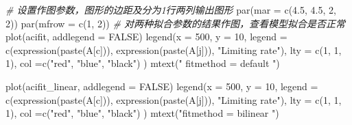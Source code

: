 \documentclass[
]{krantz}
\makeatletter
\newenvironment{Shaded}{\begin{snugshade}}{\end{snugshade}}
\newcommand{\AttributeTok}[1]{\textcolor[rgb]{0.77,0.63,0.00}{#1}}
\newcommand{\CommentTok}[1]{\textcolor[rgb]{0.56,0.35,0.01}{\textit{#1}}}
\newcommand{\ConstantTok}[1]{\textcolor[rgb]{0.00,0.00,0.00}{#1}}
\newcommand{\DecValTok}[1]{\textcolor[rgb]{0.00,0.00,0.81}{#1}}
\newcommand{\FloatTok}[1]{\textcolor[rgb]{0.00,0.00,0.81}{#1}}
\newcommand{\FunctionTok}[1]{\textcolor[rgb]{0.00,0.00,0.00}{#1}}
\newcommand{\NormalTok}[1]{#1}
\newcommand{\StringTok}[1]{\textcolor[rgb]{0.31,0.60,0.02}{#1}}
\newenvironment{kframe}{%
\medskip{}
\setlength{\fboxsep}{.8em}
 \def\at@end@of@kframe{}%
 \ifinner\ifhmode%
  \def\at@end@of@kframe{\end{minipage}}%
  \begin{minipage}{\columnwidth}%
 \fi\fi%
 \def\FrameCommand##1{\hskip\@totalleftmargin \hskip-\fboxsep
 \colorbox{shadecolor}{##1}\hskip-\fboxsep
     \hskip-\linewidth \hskip-\@totalleftmargin \hskip\columnwidth}%
 \MakeFramed {\advance\hsize-\width
   \@totalleftmargin\z@ \linewidth\hsize
   \@setminipage}}%
 {\par\unskip\endMakeFramed%
 \at@end@of@kframe}
\renewenvironment{Shaded}{\begin{kframe}}{\end{kframe}}
\makeatother
\begin{document}
\begin{Shaded}
\begin{Highlighting}[]
\CommentTok{\# 设置作图参数，图形的边距及分为1行两列输出图形}
\FunctionTok{par}\NormalTok{(}\AttributeTok{mar =} \FunctionTok{c}\NormalTok{(}\FloatTok{4.5}\NormalTok{, }\FloatTok{4.5}\NormalTok{, }\DecValTok{2}\NormalTok{, }\DecValTok{2}\NormalTok{))}
\FunctionTok{par}\NormalTok{(}\AttributeTok{mfrow =} \FunctionTok{c}\NormalTok{(}\DecValTok{1}\NormalTok{, }\DecValTok{2}\NormalTok{))}
\CommentTok{\# 对两种拟合参数的结果作图，查看模型拟合是否正常}
\FunctionTok{plot}\NormalTok{(acifit, }\AttributeTok{addlegend =} \ConstantTok{FALSE}\NormalTok{)}
\FunctionTok{legend}\NormalTok{(}\AttributeTok{x =} \DecValTok{500}\NormalTok{, }\AttributeTok{y =} \DecValTok{10}\NormalTok{, }
       \AttributeTok{legend =} \FunctionTok{c}\NormalTok{(}\FunctionTok{expression}\NormalTok{(}\FunctionTok{paste}\NormalTok{(A[c])), }
                \FunctionTok{expression}\NormalTok{(}\FunctionTok{paste}\NormalTok{(A[j])),}
                \StringTok{"Limiting rate"}\NormalTok{),}
       \AttributeTok{lty =} \FunctionTok{c}\NormalTok{(}\DecValTok{1}\NormalTok{, }\DecValTok{1}\NormalTok{, }\DecValTok{1}\NormalTok{),}
       \AttributeTok{col =}\FunctionTok{c}\NormalTok{(}\StringTok{"red"}\NormalTok{, }\StringTok{"blue"}\NormalTok{, }\StringTok{"black"}\NormalTok{) }
\NormalTok{         )}
\FunctionTok{mtext}\NormalTok{(}\StringTok{" fitmethod = \textquotesingle{}default\textquotesingle{} "}\NormalTok{)}

\FunctionTok{plot}\NormalTok{(acifit\_linear, }\AttributeTok{addlegend =} \ConstantTok{FALSE}\NormalTok{)}
\FunctionTok{legend}\NormalTok{(}\AttributeTok{x =} \DecValTok{500}\NormalTok{, }\AttributeTok{y =} \DecValTok{10}\NormalTok{, }
       \AttributeTok{legend =} \FunctionTok{c}\NormalTok{(}\FunctionTok{expression}\NormalTok{(}\FunctionTok{paste}\NormalTok{(A[c])), }
                  \FunctionTok{expression}\NormalTok{(}\FunctionTok{paste}\NormalTok{(A[j])),}
                  \StringTok{"Limiting rate"}\NormalTok{),}
       \AttributeTok{lty =} \FunctionTok{c}\NormalTok{(}\DecValTok{1}\NormalTok{, }\DecValTok{1}\NormalTok{, }\DecValTok{1}\NormalTok{),}
       \AttributeTok{col =}\FunctionTok{c}\NormalTok{(}\StringTok{"red"}\NormalTok{, }\StringTok{"blue"}\NormalTok{, }\StringTok{"black"}\NormalTok{) }
\NormalTok{)}
\FunctionTok{mtext}\NormalTok{(}\StringTok{"fitmethod = \textquotesingle{}bilinear\textquotesingle{} "}\NormalTok{)}
\end{Highlighting}
\end{Shaded}
\end{document}

